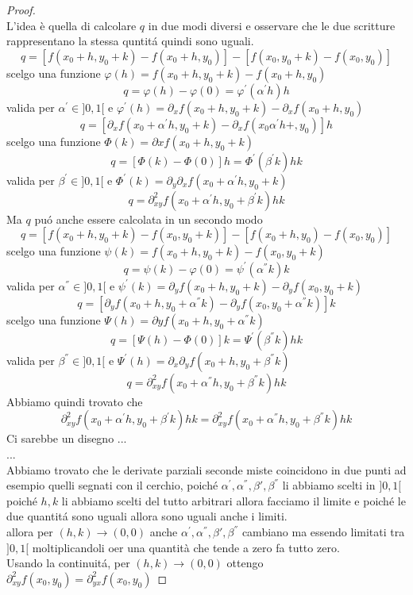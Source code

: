 \begin{proof}
\begin{tikzpicture}
	\end{tikzpicture}\\
	L'idea è quella di calcolare $q$ in due modi diversi e osservare che le due scritture rappresentano la stessa quntit\'a quindi sono uguali.\\
	$$q=[f(x_0+h,y_0+k)-f(x_0+h,y_0)]-[f(x_0,y_0+k)-f(x_0,y_0)]$$
	scelgo una funzione $\varphi(h)=f(x_0+h,y_0+k)-f(x_0+h,y_0)$
	$$q=\varphi(h)-\varphi(0) = \varphi^{'}(\alpha^{'} h)h$$
	valida per $\alpha^{'}\in ]0,1[$ e $\varphi^{'}(h)=\partial_{x}f(x_0+h,y_0+k)-\partial_{x}f(x_0+h,y_0)$
	$$q = [\partial_{x}f(x_0+\alpha^{'}h,y_0+k)-\partial_{x}f(x_0\alpha^{'}h+,y_0)]h$$
	scelgo una funzione $\varPhi(k)=\partial{x}f(x_0+h,y_0+k)$
	$$q=[\varPhi(k)-\varPhi(0)]h=\varPhi^{'}(\beta^{'}k)hk$$
	valida per $\beta^{'}\in ]0,1[$ e $\varPhi^{'}(k)=\partial_{y}\partial_{x}f(x_0+\alpha^{'}h,y_0+k)$
	$$q = \partial^2_{xy}f(x_0+\alpha^{'}h,y_0+\beta^{'}k)hk$$
	Ma $q$ pu\'o anche essere calcolata in un secondo modo
	$$q=[f(x_0+h,y_0+k)-f(x_0,y_0+k)]-[f(x_0+h,y_0)-f(x_0,y_0)]$$
	scelgo una funzione $\psi(k)=f(x_0+h,y_0+k)-f(x_0,y_0+k)$
	$$q=\psi(k)-\varphi(0) = \psi^{'}(\alpha^{''}k)k$$
	valida per $\alpha^{''}\in ]0,1[$ e $\psi^{'}(k)=\partial_{y}f(x_0+h,y_0+k)-\partial_{y}f(x_0,y_0+k)$
	$$q = [\partial_{y}f(x_0+h,y_0+\alpha^{''}k)-\partial_{y}f(x_0,y_0+\alpha^{''}k)]k$$
	scelgo una funzione $\Psi(h)=\partial{y}f(x_0+h,y_0+\alpha^{''}k)$
	$$q=[\Psi(h)-\varPhi(0)]k=\Psi^{'}(\beta^{''}k)hk$$
	valida per $\beta^{''}\in ]0,1[$ e $\Psi^{'}(h)=\partial_{x}\partial_{y}f(x_0+h,y_0+\beta^{''}k)$
	$$q = \partial^2_{xy}f(x_0+\alpha^{''}h,y_0+\beta^{''}k)hk$$
	Abbiamo quindi trovato che 
	$$ \partial^2_{xy}f(x_0+\alpha^{'}h,y_0+\beta^{'}k)hk = \partial^2_{xy}f(x_0+\alpha^{''}h,y_0+\beta^{''}k)hk$$
	Ci sarebbe un disegno ...\\
	...\\
	Abbiamo trovato che le derivate parziali seconde miste coincidono in due punti ad esempio quelli segnati con il cerchio, poich\'e $\alpha^{'},\alpha^{''},\beta{'},\beta^{''}$ li abbiamo scelti in $]0,1[$\\
	poich\'e $h,k$ li abbiamo scelti del tutto arbitrari allora facciamo il limite e poich\'e le due quantit\'a sono uguali allora sono uguali anche i limiti.\\
	allora per $(h,k)\rightarrow (0,0)$ anche $\alpha^{'},\alpha^{''},\beta{'},\beta^{''}$ cambiano ma essendo limitati tra $]0,1[$ moltiplicandoli oer una quantità che tende a zero fa tutto zero.\\
	Usando la continuit\'a, per $(h,k)\rightarrow (0,0)$ ottengo $\partial^2_{xy}f(x_0,y_0)=\partial^2_{yx}f(x_0,y_0)$
\end{proof}
